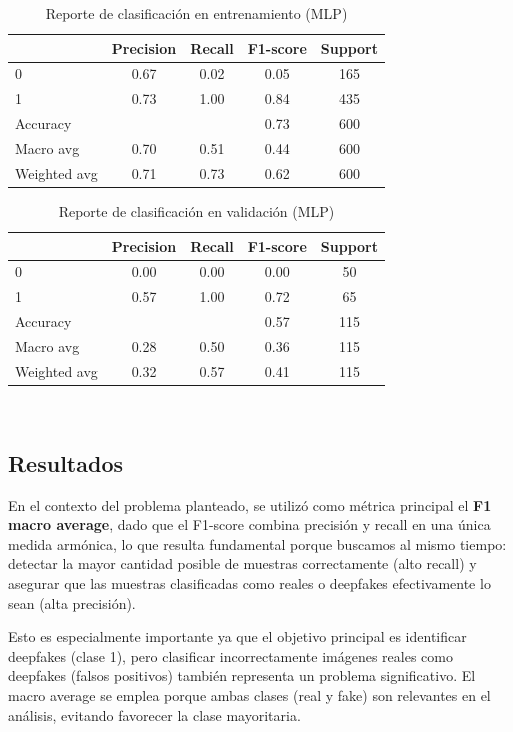 \documentclass[conference]{IEEEtran}
\begin{document}
\begin{table}[htbp]
\centering
\caption{Reporte de clasificación en entrenamiento (MLP)}
\begin{tabular}{lcccc}
\toprule
 & Precision & Recall & F1-score & Support \\
\midrule
0 & 0.67 & 0.02 & 0.05 & 165 \\
1 & 0.73 & 1.00 & 0.84 & 435 \\
\midrule
Accuracy & & & 0.73 & 600 \\
Macro avg & 0.70 & 0.51 & 0.44 & 600 \\
Weighted avg & 0.71 & 0.73 & 0.62 & 600 \\
\bottomrule
\end{tabular}
\label{tab:mlp_train}
\end{table}

\begin{table}[htbp]
\centering
\caption{Reporte de clasificación en validación (MLP)}
\begin{tabular}{lcccc}
\toprule
 & Precision & Recall & F1-score & Support \\
\midrule
0 & 0.00 & 0.00 & 0.00 & 50 \\
1 & 0.57 & 1.00 & 0.72 & 65 \\
\midrule
Accuracy & & & 0.57 & 115 \\
Macro avg & 0.28 & 0.50 & 0.36 & 115 \\
Weighted avg & 0.32 & 0.57 & 0.41 & 115 \\
\bottomrule
\end{tabular}
\label{tab:mlp_val}
\end{table}\\





\subsection{Resultados}
En el contexto del problema planteado, se utilizó como métrica principal el \textbf{F1 macro average}, dado que el F1-score combina precisión y recall en una única medida armónica, lo que resulta fundamental porque buscamos al mismo tiempo:
detectar la mayor cantidad posible de muestras correctamente (alto recall) y 
asegurar que las muestras clasificadas como reales o deepfakes efectivamente lo sean (alta precisión). 

Esto es especialmente importante ya que el objetivo principal es identificar deepfakes (clase 1), pero clasificar incorrectamente imágenes reales como deepfakes (falsos positivos) también representa un problema significativo.  
El macro average se emplea porque ambas clases (real y fake) son relevantes en el análisis, evitando favorecer la clase mayoritaria.
\end{document}
